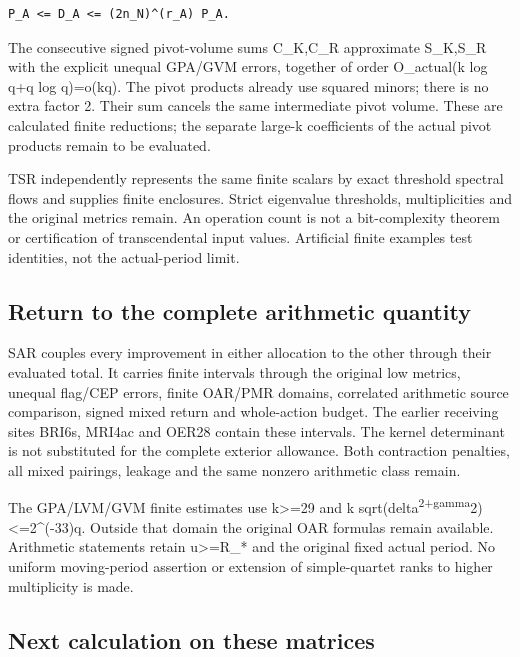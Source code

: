 \documentclass[
]{article}
\begin{document}
\begin{verbatim}
P_A <= D_A <= (2n_N)^(r_A) P_A.
\end{verbatim}

The consecutive signed pivot-volume sums C\_K,C\_R approximate S\_K,S\_R
with the explicit unequal GPA/GVM errors, together of order O\_actual(k
log q+q log q)=o(kq). The pivot products already use squared minors;
there is no extra factor 2. Their sum cancels the same intermediate
pivot volume. These are calculated finite reductions; the separate
large-k coefficients of the actual pivot products remain to be
evaluated.

TSR independently represents the same finite scalars by exact threshold
spectral flows and supplies finite enclosures. Strict eigenvalue
thresholds, multiplicities and the original metrics remain. An operation
count is not a bit-complexity theorem or certification of transcendental
input values. Artificial finite examples test identities, not the
actual-period limit.

\subsection{Return to the complete arithmetic
quantity}\label{return-to-the-complete-arithmetic-quantity}

SAR couples every improvement in either allocation to the other through
their evaluated total. It carries finite intervals through the original
low metrics, unequal flag/CEP errors, finite OAR/PMR domains, correlated
arithmetic source comparison, signed mixed return and whole-action
budget. The earlier receiving sites BRI6s, MRI4ac and OER28 contain
these intervals. The kernel determinant is not substituted for the
complete exterior allowance. Both contraction penalties, all mixed
pairings, leakage and the same nonzero arithmetic class remain.

The GPA/LVM/GVM finite estimates use k\textgreater=29 and k
sqrt(delta\textsuperscript{2+gamma}2)\textless=2\^{}(-33)q. Outside that
domain the original OAR formulas remain available. Arithmetic statements
retain \textbar u\textbar\textgreater=R\_* and the original fixed actual
period. No uniform moving-period assertion or extension of
simple-quartet ranks to higher multiplicity is made.

\subsection{Next calculation on these
matrices}\label{next-calculation-on-these-matrices}
\end{document}
